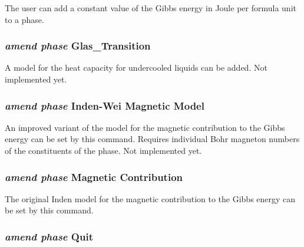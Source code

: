 \documentclass[12pt]{article}
\begin{document}
The user can add a constant value of the Gibbs energy in Joule per
formula unit to a phase.

\subsubsection{{\em amend phase} Glas\_Transition}

A model for the heat capacity for undercooled liquids can be added.
Not implemented yet.

\subsubsection{{\em amend phase} Inden-Wei Magnetic Model}

An improved variant of the model for the magnetic contribution to the
Gibbs energy can be set by this command.  Requires individual Bohr
magneton numbers of the constituents of the phase.  Not implemented
yet.

\subsubsection{{\em amend phase} Magnetic Contribution}

The original Inden model for the magnetic contribution to the Gibbs
energy can be set by this command.

\subsubsection{{\em amend phase} Quit}
\end{document}
